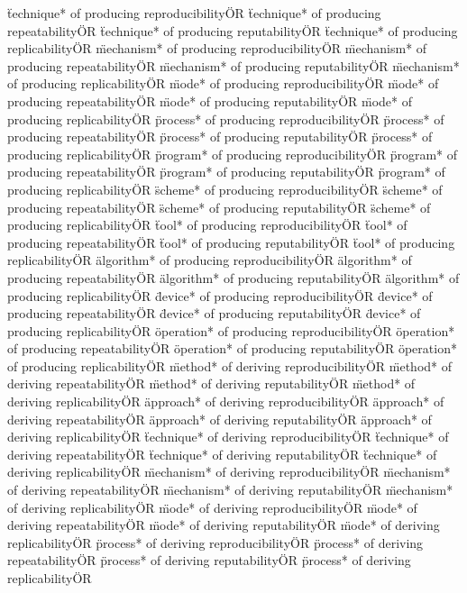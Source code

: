 \documentclass[
10pt, %
a4paper, %
oneside, %
headinclude,footinclude, %
BCOR5mm, %
]{scrartcl}
\begin{document}
\"technique* of producing reproducibility\" OR \"technique* of producing repeatability\" OR \"technique* of producing reputability\" OR \"technique* of producing replicability\" OR 
\"mechanism* of producing reproducibility\" OR \"mechanism* of producing repeatability\" OR \"mechanism* of producing reputability\" OR \"mechanism* of producing replicability\" OR 
\"mode* of producing reproducibility\" OR \"mode* of producing repeatability\" OR \"mode* of producing reputability\" OR \"mode* of producing replicability\" OR 
\"process* of producing reproducibility\" OR \"process* of producing repeatability\" OR \"process* of producing reputability\" OR \"process* of producing replicability\" OR 
\"program* of producing reproducibility\" OR \"program* of producing repeatability\" OR \"program* of producing reputability\" OR \"program* of producing replicability\" OR 
\"scheme* of producing reproducibility\" OR \"scheme* of producing repeatability\" OR \"scheme* of producing reputability\" OR \"scheme* of producing replicability\" OR 
\"tool* of producing reproducibility\" OR \"tool* of producing repeatability\" OR \"tool* of producing reputability\" OR \"tool* of producing replicability\" OR 
\"algorithm* of producing reproducibility\" OR \"algorithm* of producing repeatability\" OR \"algorithm* of producing reputability\" OR \"algorithm* of producing replicability\" OR 
\"device* of producing reproducibility\" OR \"device* of producing repeatability\" OR \"device* of producing reputability\" OR \"device* of producing replicability\" OR 
\"operation* of producing reproducibility\" OR \"operation* of producing repeatability\" OR \"operation* of producing reputability\" OR \"operation* of producing replicability\" OR 
\"method* of deriving reproducibility\" OR \"method* of deriving repeatability\" OR \"method* of deriving reputability\" OR \"method* of deriving replicability\" OR 
\"approach* of deriving reproducibility\" OR \"approach* of deriving repeatability\" OR \"approach* of deriving reputability\" OR \"approach* of deriving replicability\" OR 
\"technique* of deriving reproducibility\" OR \"technique* of deriving repeatability\" OR \"technique* of deriving reputability\" OR \"technique* of deriving replicability\" OR 
\"mechanism* of deriving reproducibility\" OR \"mechanism* of deriving repeatability\" OR \"mechanism* of deriving reputability\" OR \"mechanism* of deriving replicability\" OR 
\"mode* of deriving reproducibility\" OR \"mode* of deriving repeatability\" OR \"mode* of deriving reputability\" OR \"mode* of deriving replicability\" OR 
\"process* of deriving reproducibility\" OR \"process* of deriving repeatability\" OR \"process* of deriving reputability\" OR \"process* of deriving replicability\" OR 
\end{document}
